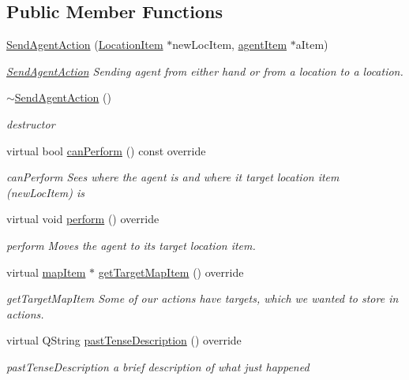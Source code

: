 \subsection*{Public Member Functions}
\begin{DoxyCompactItemize}
\item 
\hyperlink{class_send_agent_action_a4009dd9cd725c151782b82d41d91e4c5}{Send\-Agent\-Action} (\hyperlink{class_location_item}{Location\-Item} $\ast$new\-Loc\-Item, \hyperlink{classagent_item}{agent\-Item} $\ast$a\-Item)
\begin{DoxyCompactList}\small\item\em \hyperlink{class_send_agent_action}{Send\-Agent\-Action} Sending agent from either hand or from a location to a location. \end{DoxyCompactList}\item 
\hypertarget{class_send_agent_action_a88397721900aefec425027d17bf616b8}{\hyperlink{class_send_agent_action_a88397721900aefec425027d17bf616b8}{$\sim$\-Send\-Agent\-Action} ()}\label{class_send_agent_action_a88397721900aefec425027d17bf616b8}

\begin{DoxyCompactList}\small\item\em destructor \end{DoxyCompactList}\item 
virtual bool \hyperlink{class_send_agent_action_a26005ee46256f7b133079bc4aecc28cc}{can\-Perform} () const override
\begin{DoxyCompactList}\small\item\em can\-Perform Sees where the agent is and where it target location item (new\-Loc\-Item) is \end{DoxyCompactList}\item 
virtual void \hyperlink{class_send_agent_action_a2a3a88e5385724b502d1185f5ca7c9d9}{perform} () override
\begin{DoxyCompactList}\small\item\em perform Moves the agent to its target location item. \end{DoxyCompactList}\item 
virtual \hyperlink{classmap_item}{map\-Item} $\ast$ \hyperlink{class_send_agent_action_a0111cf6a2957790b34c905ad1535b6e8}{get\-Target\-Map\-Item} () override
\begin{DoxyCompactList}\small\item\em get\-Target\-Map\-Item Some of our actions have targets, which we wanted to store in actions. \end{DoxyCompactList}\item 
virtual Q\-String \hyperlink{class_send_agent_action_a80cfcff4f904152b3aa1a3f16ecb9f24}{past\-Tense\-Description} () override
\begin{DoxyCompactList}\small\item\em past\-Tense\-Description a brief description of what just happened \end{DoxyCompactList}\end{DoxyCompactItemize}


